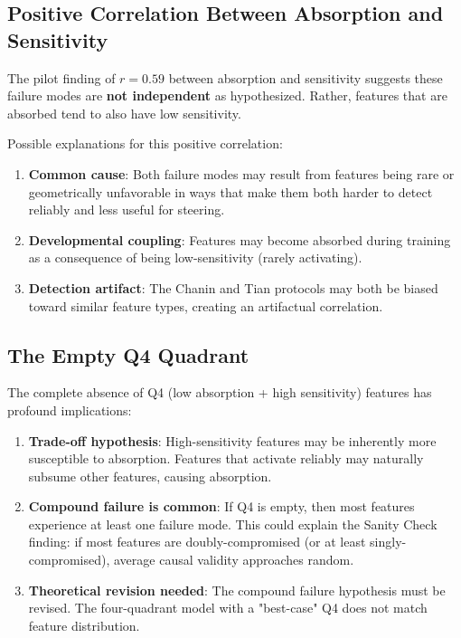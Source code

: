\documentclass{article}
\begin{document}
\subsection{Positive Correlation Between Absorption and Sensitivity}

The pilot finding of $r = 0.59$ between absorption and sensitivity suggests these failure modes are \textbf{not independent} as hypothesized. Rather, features that are absorbed tend to also have low sensitivity.

Possible explanations for this positive correlation:
\begin{enumerate}
  \item \textbf{Common cause}: Both failure modes may result from features being rare or geometrically unfavorable in ways that make them both harder to detect reliably and less useful for steering.
  \item \textbf{Developmental coupling}: Features may become absorbed during training as a consequence of being low-sensitivity (rarely activating).
  \item \textbf{Detection artifact}: The Chanin and Tian protocols may both be biased toward similar feature types, creating an artifactual correlation.
\end{enumerate}

\subsection{The Empty Q4 Quadrant}

The complete absence of Q4 (low absorption + high sensitivity) features has profound implications:

\begin{enumerate}
  \item \textbf{Trade-off hypothesis}: High-sensitivity features may be inherently more susceptible to absorption. Features that activate reliably may naturally subsume other features, causing absorption.
  \item \textbf{Compound failure is common}: If Q4 is empty, then most features experience at least one failure mode. This could explain the Sanity Check finding: if most features are doubly-compromised (or at least singly-compromised), average causal validity approaches random.
  \item \textbf{Theoretical revision needed}: The compound failure hypothesis must be revised. The four-quadrant model with a "best-case" Q4 does not match feature distribution.
\end{enumerate}
\end{document}
